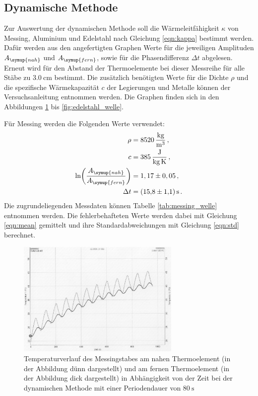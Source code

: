 \subsection{Dynamische Methode}
\label{sec:auswertung_dynamisch}

Zur Auswertung der dynamischen Methode soll die Wärmeleitfähigkeit $\kappa$ von
Messing, Aluminium und Edelstahl nach Gleichung \eqref{eqn:kappa} bestimmt werden.
Dafür werden aus den angefertigten Graphen Werte für die jeweiligen Amplituden
$A_{\symup{nah}}$ und $A_{\symup{fern}}$, sowie für die Phasendifferenz $\Delta t$ abgelesen. Erneut wird für den Abstand der
Thermoelemente bei dieser Messreihe für alle Stäbe zu $\SI{3.0}{\centi\meter}$ bestimmt.
Die zusätzlich benötigten Werte für die Dichte $\rho$ und die spezifische Wärmekapazität $c$
der Legierungen und Metalle können der Versuchsanleitung entnommen werden. Die Graphen
finden sich in den Abbildungen \ref{fig:messing_welle} bis \ref{fig:edelstahl_welle}.

Für Messing werden die Folgenden Werte verwendet:
\begin{align}
  \rho &= \SI{8520}{\kilo\gram\per\cubic\meter}\,, \nonumber\\
  c &= \SI{385}{\joule\per\kilo\gram\per\kelvin}\,, \nonumber\\
  \ln\biggl(\frac{A_{\symup{nah}}}{A_{\symup{fern}}}\biggr) &= 1,17 \pm 0,05 \,, \nonumber\\
  \Delta t &= \SI{15.8(11)}{\second} \,. \nonumber
\end{align}
Die zugrundeliegenden Messdaten können Tabelle \ref{tab:messing_welle} entnommen
werden. Die fehlerbehafteten Werte werden dabei mit Gleichung \eqref{eqn:mean} gemittelt
und ihre Standardabweichungen mit Gleichung \eqref{eqn:std} berechnet.

\begin{figure}
  \centering
  \includegraphics[width=0.7\textwidth]{data/t1undt2_welle.JPEG}
  \caption{Temperaturverlauf des Messingstabes am nahen Thermoelement (in der Abbildung dünn dargestellt)
  und am fernen Thermoelement (in der Abbildung dick dargestellt) in Abhängigkeit von der Zeit bei der
  dynamischen Methode mit einer Periodendauer von $\SI{80}{\second}$}
  \label{fig:messing_welle}
\end{figure}

